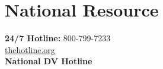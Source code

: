 \documentclass[12pt]{article}
\begin{document}
\begin{center}
\end{center}

\vspace{.5em}
\section*{National Resource}
\begin{tcolorbox}[mybox]
\begin{center}
    \textbf{24/7 Hotline:} 800-799-7233\\
    \href{https://www.thehotline.org}{thehotline.org}\\
    \textbf{National DV Hotline}\\[.5em]
\end{center}
\end{tcolorbox}

\vspace{.5em}
\end{document}
